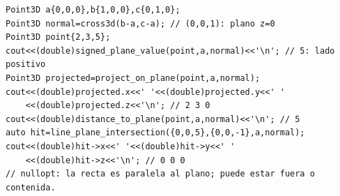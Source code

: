 \begin{lstlisting}[style=cpp]
Point3D a{0,0,0},b{1,0,0},c{0,1,0};
Point3D normal=cross3d(b-a,c-a); // (0,0,1): plano z=0
Point3D point{2,3,5};
cout<<(double)signed_plane_value(point,a,normal)<<'\n'; // 5: lado positivo
Point3D projected=project_on_plane(point,a,normal);
cout<<(double)projected.x<<' '<<(double)projected.y<<' '
    <<(double)projected.z<<'\n'; // 2 3 0
cout<<(double)distance_to_plane(point,a,normal)<<'\n'; // 5
auto hit=line_plane_intersection({0,0,5},{0,0,-1},a,normal);
cout<<(double)hit->x<<' '<<(double)hit->y<<' '
    <<(double)hit->z<<'\n'; // 0 0 0
// nullopt: la recta es paralela al plano; puede estar fuera o contenida.
\end{lstlisting}

